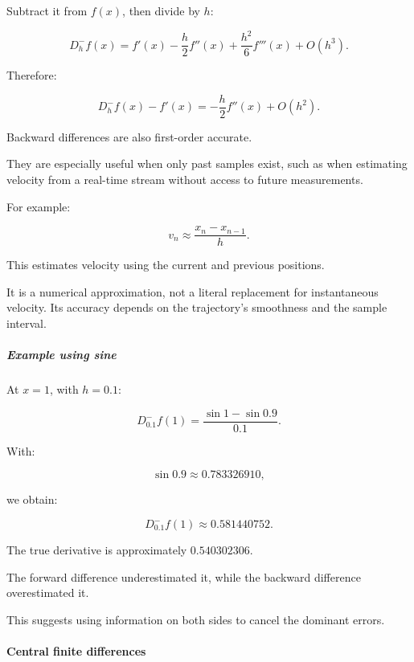 Subtract it from \(f(x)\), then divide by \(h\):

\[
D_h^-f(x) = f'(x)- \frac h2f''(x)+ \frac{h^2}{6}f'''(x)+O(h^3).
\]

Therefore:

\[
\boxed{ D_h^-f(x)-f'(x) = -\frac h2f''(x)+O(h^2) }.
\]

Backward differences are also first-order accurate.

They are especially useful when only past samples exist, such as when estimating velocity from a real-time stream without access to future measurements.

For example:

\[
v_n\approx\frac{x_n-x_{n-1}}h.
\]

This estimates velocity using the current and previous positions.

It is a numerical approximation, not a literal replacement for instantaneous velocity. Its accuracy depends on the trajectory's smoothness and the sample interval.

\begin{allmightroleexample}

\subparagraph{Example using sine}\label{02-foundations-ii-ch025-example-using-sine}

\hypertarget{02-foundations-ii-ch025-example-using-sine}{}

At \(x=1\), with \(h=0.1\):

\end{allmightroleexample}

\[
D_{0.1}^-f(1) = \frac{\sin1-\sin0.9}{0.1}.
\]

With:

\[
\sin0.9\approx0.783326910,
\]

we obtain:

\[
\boxed{ D_{0.1}^-f(1)\approx0.581440752 }.
\]

The true derivative is approximately \(0.540302306\).

The forward difference underestimated it, while the backward difference overestimated it.

This suggests using information on both sides to cancel the dominant errors.

\paragraph{Central finite differences}\label{02-foundations-ii-ch025-central-finite-differences}

\hypertarget{02-foundations-ii-ch025-central-finite-differences}{}

